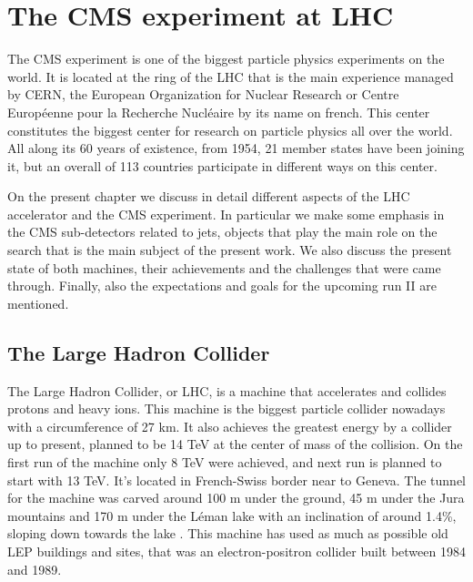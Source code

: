 \chapter[The CMS experiment at LHC]{The CMS experiment at LHC}

The CMS experiment is one of the biggest particle physics experiments on the world. It is located at the ring of the LHC that is the main experience managed by CERN, the European Organization for Nuclear Research or Centre Europ\'{e}enne pour la Recherche Nucl\'{e}aire by its name on french. This center constitutes the biggest center for research on particle physics all over the world. All along its 60 years of existence, from 1954, 21 member states have been joining it, but an overall of 113 countries participate in different ways on this center. 

On the present chapter we discuss in detail different aspects of the LHC accelerator and the CMS experiment. In particular we make some emphasis in the CMS sub-detectors related to jets, objects that play the main role on the search that is the main subject of the present work. We also discuss the present state of both machines, their achievements and the challenges that were came through. Finally, also the expectations and goals for the upcoming run II are mentioned.  

\section{The Large Hadron Collider}
\label{sec:LHC}

The Large Hadron Collider, or LHC, is a machine that accelerates and collides protons and heavy ions. This machine is the biggest particle collider nowadays with a circumference of 27 km. It also achieves the greatest energy by a collider up to present, planned to be 14 TeV at the center of mass of the collision. On the first run of the machine only 8 TeV were achieved, and next run is planned to start with 13 TeV. It's located in French-Swiss border near to Geneva. The tunnel for the machine was carved around 100 m under the ground, 45 m under the Jura mountains and 170 m under the L\'{e}man lake with an inclination of around 1.4\%, sloping down towards the lake . This machine has used as much as possible old LEP buildings and sites, that was an electron-positron collider built between 1984 and 1989. 

